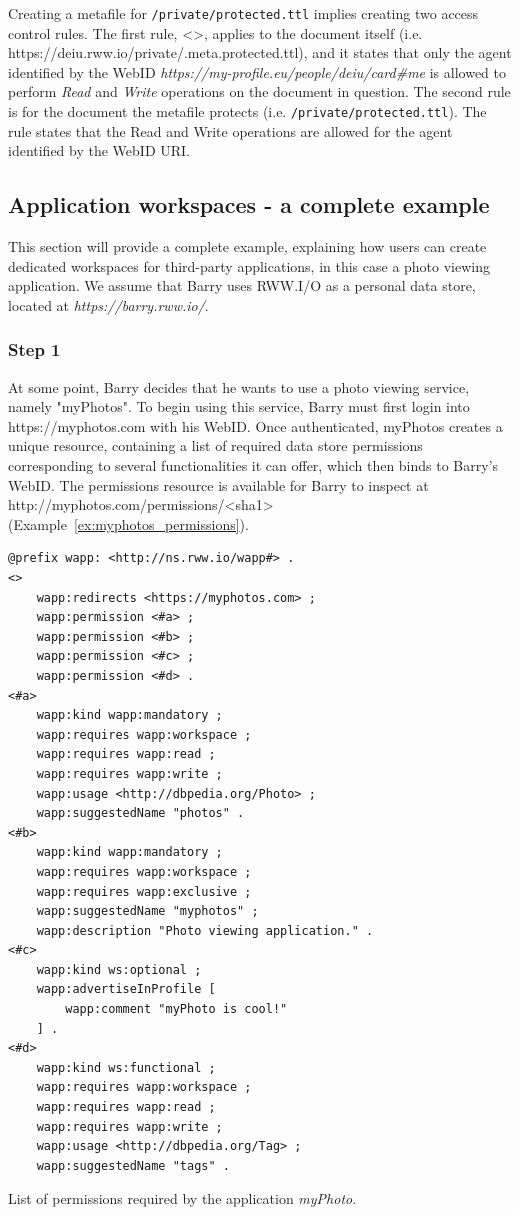 Creating a metafile for \verb+/private/protected.ttl+ implies creating two access control rules. The first rule, <>, applies to the document itself (i.e. https://deiu.rww.io/private/.meta.protected.ttl), and it states that only the agent identified by the WebID \textit{https://my-profile.eu/people/deiu/card\#me} is allowed to perform \textit{Read} and \textit{Write} operations on the document in question. The second rule is for the document the metafile protects (i.e. \verb+/private/protected.ttl+). The rule states that the Read and Write operations are allowed for the agent identified by the WebID URI.

\subsection{Application workspaces - a complete example}
This section will provide a complete example, explaining how users can create dedicated workspaces for third-party applications, in this case a photo viewing application. We assume that Barry uses RWW.I/O as a personal data store, located at \textit{https://barry.rww.io/}.\\

\subsubsection{Step 1}
At some point, Barry decides that he wants to use a photo viewing service, namely "myPhotos". To begin using this service, Barry must first login into https://myphotos.com with his WebID. Once authenticated, myPhotos creates a unique resource, containing a list of required data store permissions corresponding to several functionalities it can offer, which then binds to Barry's WebID. The permissions resource is available for Barry to inspect at http://myphotos.com/permissions/<sha1> (Example~\ref{ex:myphotos_permissions}).\\

\begin{example}[h]
\begin{verbatim}
@prefix wapp: <http://ns.rww.io/wapp#> .
<>
    wapp:redirects <https://myphotos.com> ;
    wapp:permission <#a> ;
    wapp:permission <#b> ;
    wapp:permission <#c> ;
    wapp:permission <#d> .
<#a>
    wapp:kind wapp:mandatory ;
    wapp:requires wapp:workspace ;
    wapp:requires wapp:read ;
    wapp:requires wapp:write ;
    wapp:usage <http://dbpedia.org/Photo> ;
    wapp:suggestedName "photos" .
<#b>
    wapp:kind wapp:mandatory ;
    wapp:requires wapp:workspace ;
    wapp:requires wapp:exclusive ;
    wapp:suggestedName "myphotos" ;
    wapp:description "Photo viewing application." .
<#c>
    wapp:kind ws:optional ;
    wapp:advertiseInProfile [
        wapp:comment "myPhoto is cool!"
    ] .
<#d>
    wapp:kind ws:functional ;
    wapp:requires wapp:workspace ;
    wapp:requires wapp:read ;
    wapp:requires wapp:write ;
    wapp:usage <http://dbpedia.org/Tag> ;
    wapp:suggestedName "tags" .
\end{verbatim}
\caption{List of permissions required by the application \textit{myPhoto}.}
\label{ex:myphotos_permissions}
\end{example}

